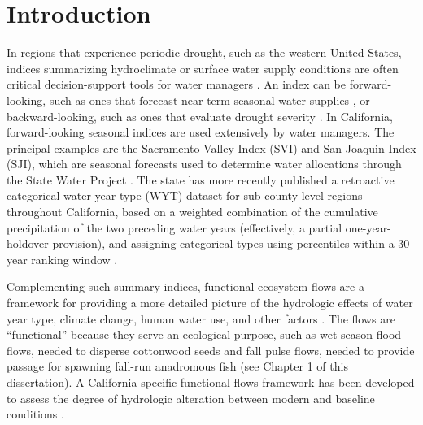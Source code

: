 \documentclass[hess, manuscript]{copernicus}
\begin{document}
\section{Introduction}

In regions that experience periodic drought, such as the western United
States, indices summarizing hydroclimate or surface water supply
conditions are often critical decision-support tools for water managers
\citep[e.g.,][]{Garen1993}. An index can be forward-looking, such as
ones that forecast near-term seasonal water supplies
\citep[e.g.,][]{Null2013, Verley2020}, or backward-looking, such as ones
that evaluate drought severity
\citep[e.g.,][]{Palmer1965, Guttman1998a, McKee1993, Wilhite1985, Wilhite2000}.
In California, forward-looking seasonal indices are used extensively by
water managers. The principal examples are the Sacramento Valley Index
(SVI) and San Joaquin Index (SJI), which are seasonal forecasts used to
determine water allocations through the State Water Project
\citetext{\citealp{Null2013}; \citeyear[DWR][]{DWR2022}}. The state has
more recently published a retroactive categorical water year type (WYT)
dataset for sub-county level regions throughout California, based on a
weighted combination of the cumulative precipitation of the two
preceding water years (effectively, a partial one-year-holdover
provision), and assigning categorical types using percentiles within a
30-year ranking window \citeyearpar[DWR][]{DWR2021a}.

Complementing such summary indices, functional ecosystem flows are a
framework for providing a more detailed picture of the hydrologic
effects of water year type, climate change, human water use, and other
factors \citep[e.g.,][]{Poff1997, Bunn2002, Poff2010, Wheeler2018}. The
flows are ``functional'' because they serve an ecological purpose, such
as wet season flood flows, needed to disperse cottonwood seeds
\citep{Mahoney1998} and fall pulse flows, needed to provide passage for
spawning fall-run anadromous fish (see Chapter 1 of this dissertation).
A California-specific functional flows framework has been developed to
assess the degree of hydrologic alteration between modern and baseline
conditions \citep{Yarnell2020, Patterson2020}.
\end{document}
